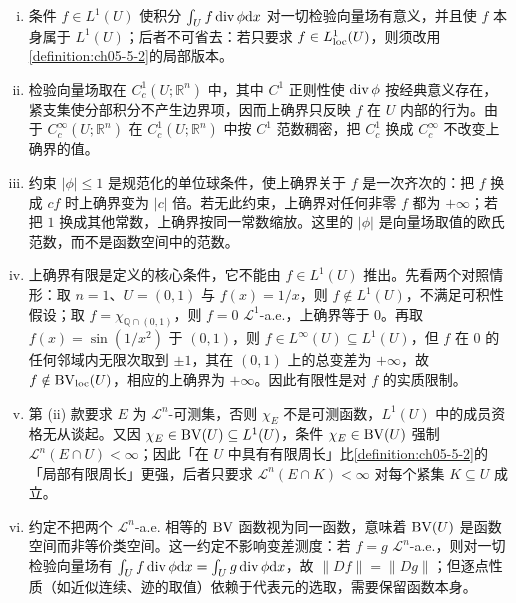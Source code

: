 \documentclass[../../main.tex]{subfiles}%
\begin{document}
\begin{remark}\label{remark:ch05-def-5-1-条件}
\begin{enumerate}[(i)]
\item 条件 $f\in L^1(U)$ 使积分 $\int_U f\operatorname{div}\phi\mathrm{d} x$ 对一切检验向量场有意义，并且使 $f$ 本身属于 $L^1(U)$；后者不可省去：若只要求 $f\in L^1_{\mathrm{loc}}(U)$，则须改用\cref{definition:ch05-5-2}的局部版本。%
\item 检验向量场取在 $C_c^1(U;\mathbb{R}^n)$ 中，其中 $C^1$ 正则性使 $\operatorname{div}\phi$ 按经典意义存在，紧支集使分部积分不产生边界项，因而上确界只反映 $f$ 在 $U$ 内部的行为。由于 $C_c^{\infty}(U;\mathbb{R}^n)$ 在 $C_c^1(U;\mathbb{R}^n)$ 中按 $C^1$ 范数稠密，把 $C_c^1$ 换成 $C_c^{\infty}$ 不改变上确界的值。
\item 约束 $\lvert\phi\rvert\leqslant1$ 是规范化的单位球条件，使上确界关于 $f$ 是一次齐次的：把 $f$ 换成 $cf$ 时上确界变为 $\lvert c\rvert$ 倍。若无此约束，上确界对任何非零 $f$ 都为 $+\infty$；若把 $1$ 换成其他常数，上确界按同一常数缩放。这里的 $\lvert\phi\rvert$ 是向量场取值的欧氏范数，而不是函数空间中的范数。
\item 上确界有限是定义的核心条件，它不能由 $f\in L^1(U)$ 推出。先看两个对照情形：取 $n=1$、$U=(0,1)$ 与 $f(x)=1/x$，则 $f\notin L^1(U)$，不满足可积性假设；取 $f=\chi_{\mathbb{Q}\cap(0,1)}$，则 $f=0$ $\mathcal{L}^1$-a.e.，上确界等于 $0$。再取 $f(x)=\sin(1/x^2)$ 于 $(0,1)$，则 $f\in L^{\infty}(U)\subseteq L^1(U)$，但 $f$ 在 $0$ 的任何邻域内无限次取到 $\pm1$，其在 $(0,1)$ 上的总变差为 $+\infty$，故 $f\notin\mathrm{BV}_{\mathrm{loc}}(U)$，相应的上确界为 $+\infty$。因此有限性是对 $f$ 的实质限制。
\item 第 (ii) 款要求 $E$ 为 $\mathcal{L}^n$-可测集，否则 $\chi_E$ 不是可测函数，$L^1(U)$ 中的成员资格无从谈起。又因 $\chi_E\in\mathrm{BV}(U)\subseteq L^1(U)$，条件 $\chi_E\in\mathrm{BV}(U)$ 强制 $\mathcal{L}^n(E\cap U)<\infty$；因此「在 $U$ 中具有有限周长」比\cref{definition:ch05-5-2}的「局部有限周长」更强，后者只要求 $\mathcal{L}^n(E\cap K)<\infty$ 对每个紧集 $K\subseteq U$ 成立。%
\item 约定不把两个 $\mathcal{L}^n$-a.e. 相等的 $\mathrm{BV}$ 函数视为同一函数，意味着 $\mathrm{BV}(U)$ 是函数空间而非等价类空间。这一约定不影响变差测度：若 $f=g$ $\mathcal{L}^n$-a.e.，则对一切检验向量场有 $\int_U f\operatorname{div}\phi\mathrm{d} x=\int_U g\operatorname{div}\phi\mathrm{d} x$，故 $\lVert Df\rVert=\lVert Dg\rVert$；但逐点性质（如近似连续、迹的取值）依赖于代表元的选取，需要保留函数本身。
\end{enumerate}
\end{remark}
\end{document}
